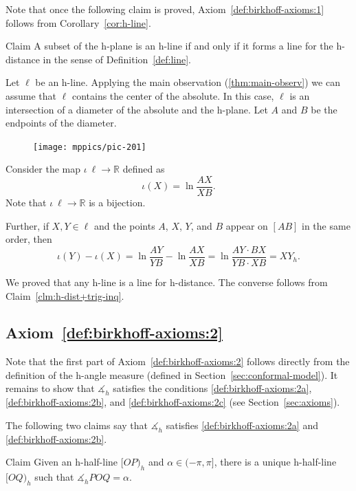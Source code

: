 Note that once the following claim is proved,
Axiom~\ref{def:birkhoff-axioms:1} 
follows from Corollary~\ref{cor:h-line}.

\begin{thm}{Claim}
A subset of the h-plane is an h-line if and only if it forms a line for the h-distance in the sense of Definition~\ref{def:line}.
\end{thm}

Let $\ell$ be an h-line.
Applying the main observation (\ref{thm:main-observ}) we can assume that $\ell$ contains the center of the absolute.
In this case, $\ell$ is an intersection of a diameter of the absolute and the h-plane.
Let $A$ and $B$ be the endpoints of the diameter.

\begin{figure}
\vskip-5mm
\centering
\texttt{[image: mppics/pic-201]}
\end{figure}

Consider the map $\iota\:\ell\to \mathbb{R}$ defined as
$$\iota(X)=\ln \frac{AX}{XB}.$$
Note that $\iota\:\ell\to \mathbb{R}$ is a bijection.

Further, if $X,Y\in \ell$ and the points $A$, $X$, $Y$, and $B$ appear on $[AB]$ in the same order, then
\[\iota(Y)-\iota(X)=\ln \frac{AY}{YB}-\ln \frac{AX}{XB}=\ln \frac{AY\cdot BX}{YB\cdot XB}=XY_h.\]

We proved that any h-line is a line for h-distance.
The converse follows from Claim~\ref{clm:h-dist+trig-inq}.
\qeds


\subsection*{Axiom~\ref{def:birkhoff-axioms:2}}

Note that the first part of Axiom~\ref{def:birkhoff-axioms:2} follows directly from the definition of the h-angle measure (defined in Section~\ref{sec:conformal-model}).
It remains to show that $\measuredangle_h$ satisfies the conditions \ref{def:birkhoff-axioms:2a}, \ref{def:birkhoff-axioms:2b}, and \ref{def:birkhoff-axioms:2c} (see Section~\ref{sec:axioms}).

The following two claims say that
$\measuredangle_h$ satisfies
 \ref{def:birkhoff-axioms:2a} and \ref{def:birkhoff-axioms:2b}.

\begin{thm}{Claim}\label{clm:h2a}
Given an h-half-line $[O P)_h$ and $\alpha\in(-\pi,\pi]$, there is a unique h-half-line $[O Q)_h$ such that $\measuredangle_h P O Q= \alpha$.
\end{thm}


